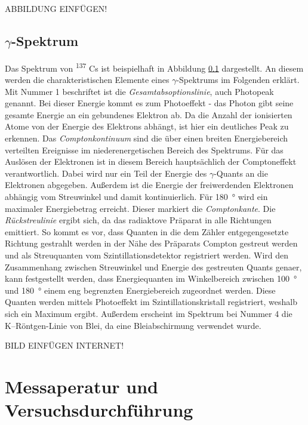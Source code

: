 \documentclass[a4paper,twoside,final]{article}
\begin{document}
ABBILDUNG EINFÜGEN!

\subsection{$\gamma$-Spektrum}
Das Spektrum von \textsuperscript{137} Cs ist beispielhaft in Abbildung \ref{} dargestellt. An diesem werden die charakteristischen Elemente eines $\gamma$-Spektrums im Folgenden erklärt. \\
Mit Nummer 1 beschriftet ist die \textit{Gesamtabsoptionslinie}, auch Photopeak genannt. Bei dieser Energie kommt es zum Photoeffekt - das Photon gibt seine gesamte Energie an ein gebundenes Elektron ab. Da die Anzahl der ionisierten Atome von der Energie des Elektrons abhängt, ist hier ein deutliches Peak zu erkennen. Das \textit{Comptonkontinuum} sind die über einen breiten Energiebereich verteilten Ereignisse im niederenergetischen Bereich des Spektrums. Für das Auslösen der Elektronen ist in diesem Bereich hauptsächlich der Comptoneffekt verantwortlich. Dabei wird nur ein Teil der Energie des $\gamma$-Quants an die Elektronen abgegeben. Außerdem ist die Energie der freiwerdenden Elektronen abhängig vom Streuwinkel und damit kontinuierlich. Für \SI{180}{\degree} wird ein maximaler Energiebetrag erreicht. Dieser markiert die \textit{Comptonkante}. Die \textit{Rückstreulinie} ergibt sich, da das radiaktove Präparat in alle Richtungen emittiert. So kommt es vor, dass Quanten in die dem Zähler entgegengesetzte Richtung gestrahlt werden in der Nähe des Präparats Compton gestreut werden und als Streuquanten vom Szintillationsdetektor registriert werden. Wird den Zusammenhang zwischen Streuwinkel und Energie des gestreuten Quants genaer, kann festgestellt werden, dass Energiequanten im Winkelbereich zwischen \SI{100}{\degree} und \SI{180}{\degree} einem eng begrenzten Energiebereich zugeordnet werden. Diese Quanten werden mittels Photoeffekt im Szintillationskristall registriert, weshalb sich ein Maximum ergibt. Außerdem erscheint im Spektrum bei Nummer 4 die K--Röntgen-Linie von Blei, da eine Bleiabschirmung verwendet wurde.

BILD EINFÜGEN INTERNET!

\section{Messaperatur und Versuchsdurchführung} \label{sec:Versuchsdurchführung}
\end{document}
